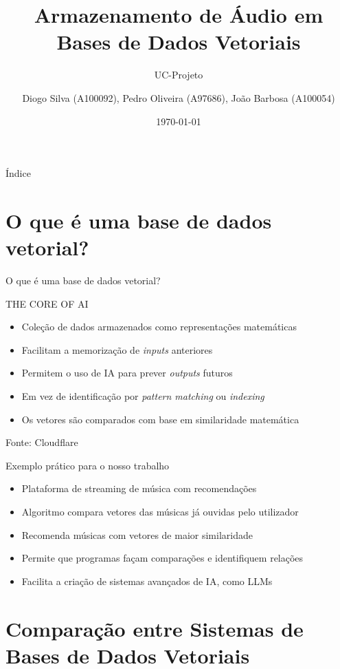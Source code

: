 \documentclass{beamer}
\title{Armazenamento de Áudio em Bases de Dados Vetoriais}
\subtitle{UC-Projeto}
\author{Diogo Silva (A100092), Pedro Oliveira (A97686), João Barbosa (A100054)}
\institute{Universidade do Minho}
\date{\today}
\begin{document}
\begin{frame}
    \titlepage
\end{frame}

\begin{frame}{Índice}
    \tableofcontents
\end{frame}

\section{O que é uma base de dados vetorial?}

\begin{frame}{O que é uma base de dados vetorial?}

    THE CORE OF AI 
    \begin{itemize}
        \item Coleção de dados armazenados como representações matemáticas
        \item Facilitam a memorização de \textit{inputs} anteriores
        \item Permitem o uso de IA para prever \textit{outputs} futuros
        \item Em vez de identificação por \textit{pattern matching} ou \textit{indexing}
        \item Os vetores são comparados com base em similaridade matemática
    \end{itemize}
    
    \vspace{0.5cm}
    \footnotesize{Fonte: Cloudflare}
\end{frame}

\begin{frame}{Exemplo prático para o nosso trabalho}
    \begin{itemize}
        \item Plataforma de streaming de música com recomendações
        \item Algoritmo compara vetores das músicas já ouvidas pelo utilizador
        \item Recomenda músicas com vetores de maior similaridade
        \item Permite que programas façam comparações e identifiquem relações
        \item Facilita a criação de sistemas avançados de IA, como LLMs
    \end{itemize}
\end{frame}

\section{Comparação entre Sistemas de Bases de Dados Vetoriais}
\end{document}
